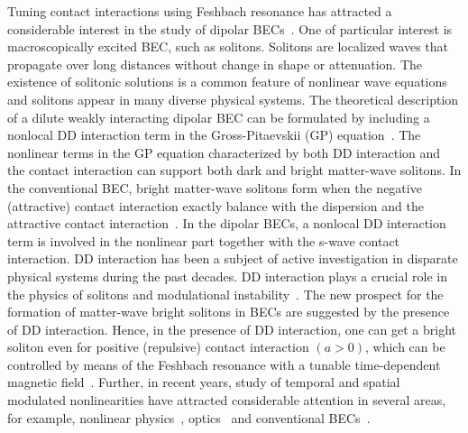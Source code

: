 \documentclass[amsmath,amssymb,article,twocolumn,superscriptaddress,showpacs,10pt]{revtex4-1}
\begin{document}
Tuning contact interactions using Feshbach resonance has attracted a considerable interest in the study of dipolar BECs~\cite{Goral:2000,Yi:2000,Giovanazzi:2003,Yi:2003,Giovanazzi:2006,Lin:2008,
Goral:2002,Santos:2000,Santos:2003,O'Dell:2004,Pedri:2005,Tikhonenkov:2008,Young-S:2011,Goral:2002,Cooper:2005,Zhang:2005,Rezayi:2005}. One of particular interest is macroscopically excited BEC, such as solitons. Solitons are localized waves that propagate over long distances without change in shape or attenuation. The existence of solitonic solutions is a common feature of nonlinear wave equations and solitons appear in many diverse physical systems. The theoretical description of a dilute weakly interacting dipolar BEC can be formulated by including a nonlocal DD interaction term in the Gross-Pitaevskii (GP) equation~\cite{Koch:2008,Lahaye:2009,Muruganandam:2012,Muruganandam:2011,Lahaye:2008}. The nonlinear terms in the GP equation characterized by both DD interaction and the contact interaction can support both dark and bright matter-wave solitons. In  the conventional BEC, bright matter-wave solitons form when the negative (attractive) contact interaction exactly balance with the dispersion and the attractive contact interaction~\cite{Strecker:2002,Khaykovich:1995,Khawaja:2002}. In the dipolar BECs, a nonlocal DD interaction term is involved in the nonlinear part together with the s-wave contact interaction. DD interaction has been a subject of active investigation in disparate physical systems during the past decades. DD interaction plays a crucial role in the physics of solitons and modulational instability~\cite{Krolikowski:2001,Bang:2002}. The new prospect for the formation of matter-wave bright solitons in BECs are suggested by the presence of DD interaction.  
Hence, in the presence of DD interaction, one can get a bright soliton even for positive (repulsive) contact interaction $(a > 0)$, which can be controlled by means of the Feshbach resonance with a tunable time-dependent magnetic field~\cite{Muruganandam:2012,Muruganandam:2011}. Further, in recent years, study of temporal and spatial modulated nonlinearities have attracted considerable attention in several areas, for example, nonlinear physics~\cite{Kivshar:1971}, optics~\cite{Zeng:2012,Dai:2011, Alberucci:2013} and conventional  BECs~\cite{Sabari:2010,Adhikari:2004,Saito:2003,Wu:2010}.
\end{document}
